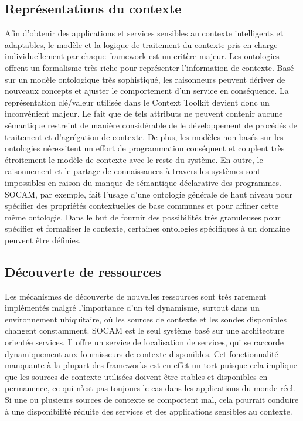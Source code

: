 \subsection{Représentations du contexte}

Afin d'obtenir des applications et services sensibles au contexte intelligents
et adaptables, le modèle et la logique de traitement du contexte pris en charge
individuellement par chaque framework est un critère majeur. Les ontologies
offrent un formalisme très riche pour représenter l'information de contexte.
Basé sur un modèle ontologique très sophistiqué, les raisonneurs peuvent dériver
de nouveaux concepts et ajuster le comportement d'un service en conséquence. La
représentation clé/valeur utilisée dans le Context Toolkit devient donc un
inconvénient majeur. Le fait que de tels attributs ne peuvent contenir aucune
sémantique restreint de manière considérable de le développement de procédés de
traitement et d'agrégation de contexte. De plus, les modèles non basés sur les
ontologies nécessitent un effort de programmation conséquent et couplent très
étroitement le modèle de contexte avec le reste du système. En outre, le
raisonnement et le partage de connaissances à travers les systèmes sont
impossibles en raison du manque de sémantique déclarative des programmes. SOCAM,
par exemple, fait l'usage d'une ontologie générale de haut niveau pour spécifier
des propriétés contextuelles de base communes et pour affiner cette même
ontologie. Dans le but de fournir des possibilités très granuleuses pour
spécifier et formaliser le contexte, certaines ontologies spécifiques à un
domaine peuvent être définies.

\subsection{Découverte de ressources}

Les mécanismes de découverte de nouvelles ressources sont très rarement
implémentés malgré l'importance d'un tel dynamisme, surtout dans un environnement
ubiquitaire, où les sources de contexte et les sondes disponibles changent
constamment. SOCAM est le seul système basé sur une architecture orientée
services. Il offre un service de localisation de services, qui se raccorde
dynamiquement aux fournisseurs de contexte disponibles. Cet fonctionnalité
manquante à la plupart des frameworks est en effet un tort puisque cela implique
que les sources de contexte utilisées doivent être stables et disponibles en
permanence, ce qui n'est pas toujours le cas dans les applications du monde
réel. Si une ou plusieurs sources de contexte se comportent mal, cela pourrait
conduire à une disponibilité réduite des services et des applications sensibles
au contexte.


